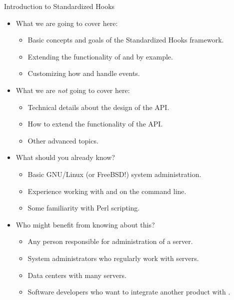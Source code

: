 
\begin{section}{Introduction to Standardized Hooks}
 \begin{itemize}
 \item What we are going to cover here:
   \begin{itemize}
   \item Basic concepts and goals of the Standardized Hooks framework.
   \item Extending the functionality of \WHM and \cPanel by example.
   \item Customizing how \WHM and \cPanel handle events.
   \end{itemize}
\item What we are {\em not} going to cover here:
  \begin{itemize}
  \item Technical details about the design of the \cPanel API.
  \item How to extend the functionality of the \cPanel API.
  \item Other advanced topics.
  \end{itemize}
\item What should you already know?
  \begin{itemize}
  \item Basic GNU/Linux (or FreeBSD!) system administration.
  \item Experience working with \cPanel and \WHM on the command line.
  \item Some familiarity with Perl scripting.
  \end{itemize}
\item Who might benefit from knowing about this?
  \begin{itemize}
  \item Any person responsible for administration of a \cPanel server.
  \item System administrators who regularly work with \cPanel servers.
  \item Data centers with many \cPanel servers.
  \item Software developers who want to integrate another product with \cPanel.
  \end{itemize}
\end{itemize}

\end{section}
